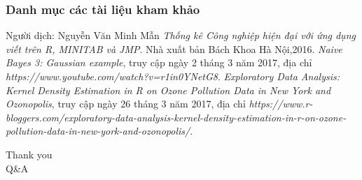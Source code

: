 \documentclass[t]{beamer}
\begin{document}
\begin{frame}
\frametitle{Danh mục các tài liệu kham khảo}
\begin{thebibliography}{}
 Người dịch: Nguyễn Văn Minh Mẫn \emph{Thống kê Công nghiệp hiện đại với ứng dụng viết trên R, MINITAB và JMP}. Nhà xuất bản Bách Khoa Hà Nội,2016.
	\emph{Naive Bayes 3: Gaussian example}, truy cập ngày 2 tháng 3 năm 2017,
	địa chỉ \emph{https://www.youtube.com/watch?v=r1in0YNetG8}.	
	\emph{Exploratory Data Analysis: Kernel Density Estimation in R on Ozone Pollution Data in New York and Ozonopolis}, truy cập ngày 26 tháng 3 năm 2017,
	địa chỉ \emph{https://www.r-bloggers.com/exploratory-data-analysis-kernel-density-estimation-in-r-on-ozone-pollution-data-in-new-york-and-ozonopolis/}.
\end{thebibliography}
\end{frame}

\begin{frame}[c]{ }
\begin{Huge}
\centering
Thank you\\Q\&A\\
\end{Huge}
\end{frame}
\end{document}
